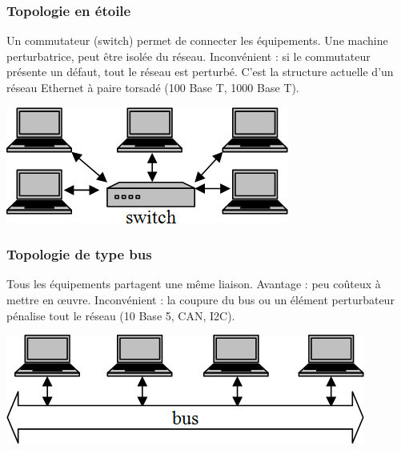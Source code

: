\documentclass[10pt]{article}
\begin{document}
\subsubsection*{Topologie en étoile}
\begin{minipage}[c]{.66\linewidth}
Un commutateur (switch) permet de connecter les équipements. Une machine perturbatrice, peut être isolée du réseau. Inconvénient : si le commutateur présente un défaut, tout le réseau est perturbé. C’est la structure actuelle d’un réseau Ethernet à paire torsadé (100 Base T, 1000 Base T).
\end{minipage} \hfill
\begin{minipage}[c]{.3\linewidth}
\begin{center}
\includegraphics[width=.95\textwidth]{images/fig_01}
\end{center}
\end{minipage} 

\subsubsection*{Topologie de type bus}
\begin{minipage}[c]{.66\linewidth}
 Tous les équipements partagent une même liaison. Avantage : peu coûteux à mettre en œuvre. Inconvénient : la coupure du bus ou un élément perturbateur pénalise tout le  réseau (10 Base 5, CAN, I2C).
\end{minipage} \hfill
\begin{minipage}[c]{.3\linewidth}
\begin{center}
\includegraphics[width=.95\textwidth]{images/fig_02}
\end{center}
\end{minipage} 
\end{document}

